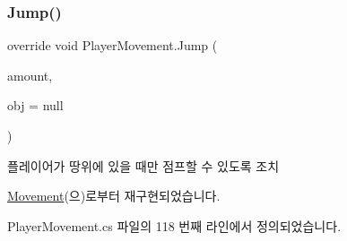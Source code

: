 \subsubsection{\texorpdfstring{Jump()}{Jump()}}
{\footnotesize\ttfamily override void Player\+Movement.\+Jump (\begin{DoxyParamCaption}\item[{float}]{amount,  }\item[{Game\+Object}]{obj = {\ttfamily null} }\end{DoxyParamCaption})\hspace{0.3cm}{\ttfamily [virtual]}}



플레이어가 땅위에 있을 때만 점프할 수 있도록 조치 



\mbox{\hyperlink{class_movement_a656604a80e3c1b86af6b7ce80932442d}{Movement}}(으)로부터 재구현되었습니다.



Player\+Movement.\+cs 파일의 118 번째 라인에서 정의되었습니다.


